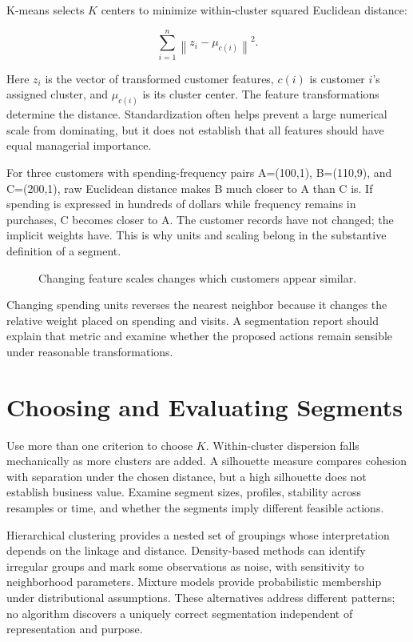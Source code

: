 K-means selects \(K\) centers to minimize within-cluster squared
Euclidean distance:

\[
\sum_{i=1}^n\left\|z_i-\mu_{c(i)}\right\|^2.
\]

Here \(z_i\) is the vector of transformed customer features, \(c(i)\) is
customer \(i\)'s assigned cluster, and \(\mu_{c(i)}\) is its cluster
center. The feature transformations determine the distance.
Standardization often helps prevent a large numerical scale from
dominating, but it does not establish that all features should have
equal managerial importance.

For three customers with spending-frequency pairs A=(100,1), B=(110,9),
and C=(200,1), raw Euclidean distance makes B much closer to A than C
is. If spending is expressed in hundreds of dollars while frequency
remains in purchases, C becomes closer to A. The customer records have
not changed; the implicit weights have. This is why units and scaling
belong in the substantive definition of a segment.

\begin{figure}[htbp]
\centering

\caption{Changing feature scales changes which customers appear similar.}\label{fig:M04_scaling}
\end{figure}

Changing spending units reverses the nearest neighbor because it changes
the relative weight placed on spending and visits. A segmentation report
should explain that metric and examine whether the proposed actions
remain sensible under reasonable transformations.

\hypertarget{M04-choosing-and-evaluating-segments}{%
\section{Choosing and Evaluating
Segments}\label{M04-choosing-and-evaluating-segments}}

\noindent Use more than one criterion to choose \(K\). Within-cluster dispersion
falls mechanically as more clusters are added. A silhouette measure
compares cohesion with separation under the chosen distance, but a high
silhouette does not establish business value. Examine segment sizes,
profiles, stability across resamples or time, and whether the segments
imply different feasible actions.

Hierarchical clustering provides a nested set of groupings whose
interpretation depends on the linkage and distance. Density-based
methods can identify irregular groups and mark some observations as
noise, with sensitivity to neighborhood parameters. Mixture models
provide probabilistic membership under distributional assumptions. These
alternatives address different patterns; no algorithm discovers a
uniquely correct segmentation independent of representation and purpose.

